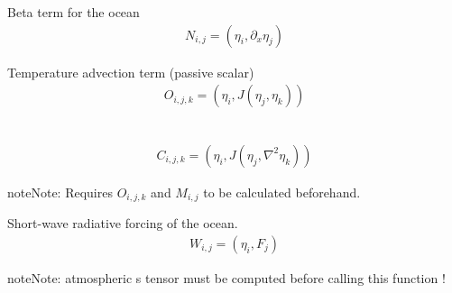 \documentclass[letterpaper,10pt,english]{sphinxmanual}
\begin{document}
\begin{fulllineitems}

\begin{fulllineitems}
\label{rstfiles/inprod_analytic:inprod_analytic.ocean_tensors.calculate_N}
Beta term for the ocean
\begin{equation*}
\begin{split}N_{i,j} = (\eta_i, \partial_x \eta_j)\end{split}
\end{equation*}
\end{fulllineitems}


\begin{fulllineitems}
\label{rstfiles/inprod_analytic:inprod_analytic.ocean_tensors.calculate_O}
Temperature advection term (passive scalar)
\begin{equation*}
\begin{split}O_{i,j,k} = (\eta_i, J(\eta_j, \eta_k))\end{split}
\end{equation*}
\end{fulllineitems}


\begin{fulllineitems}
\label{rstfiles/inprod_analytic:inprod_analytic.ocean_tensors.calculate_C_oc}~\begin{equation*}
\begin{split}C_{i,j,k} = (\eta_i, J(\eta_j,\nabla^2 \eta_k))\end{split}
\end{equation*}
\begin{notice}{note}{Note:}
Requires \(O_{i,j,k}\) and \(M_{i,j}\) to be calculated beforehand.
\end{notice}

\end{fulllineitems}


\begin{fulllineitems}
\label{rstfiles/inprod_analytic:inprod_analytic.ocean_tensors.calculate_W}
Short-wave radiative forcing of the ocean.
\begin{equation*}
\begin{split}W_{i,j} = (\eta_i, F_j)\end{split}
\end{equation*}
\begin{notice}{note}{Note:}
atmospheric s tensor must be computed before calling
this function !
\end{notice}

\end{fulllineitems}


\end{fulllineitems}
\end{document}
